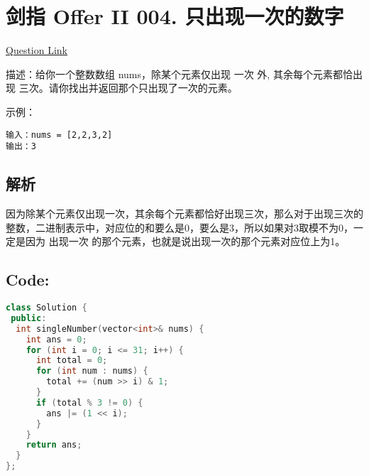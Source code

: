 ﻿\section{剑指 Offer II 004. 只出现一次的数字}

\href{https://leetcode.cn/problems/WGki4K/}{Question Link}

描述：给你一个整数数组 nums，除某个元素仅出现 一次 外, 其余每个元素都恰出现 三次。请你找出并返回那个只出现了一次的元素。

示例：

\begin{lstlisting}
输入：nums = [2,2,3,2]
输出：3
\end{lstlisting}

\subsection{解析}

因为除某个元素仅出现一次，其余每个元素都恰好出现三次，那么对于出现三次的整数，二进制表示中，对应位的和要么是0，要么是3，所以如果对3取模不为0，一定是因为 出现一次 的那个元素，也就是说出现一次的那个元素对应位上为1。

\subsection*{Code:}

\begin{lstlisting}[language=C++]
class Solution {
 public:
  int singleNumber(vector<int>& nums) {
    int ans = 0;
    for (int i = 0; i <= 31; i++) {
      int total = 0;
      for (int num : nums) {
        total += (num >> i) & 1;
      }
      if (total % 3 != 0) {
        ans |= (1 << i);
      }
    }
    return ans;
  }
};
\end{lstlisting}